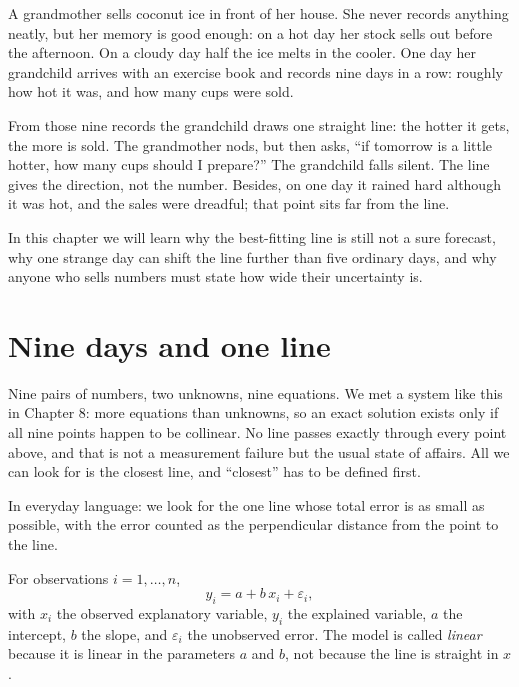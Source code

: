 \begin{untukanak}
A grandmother sells coconut ice in front of her house. She never records anything neatly, but
her memory is good enough: on a hot day her stock sells out before the afternoon. On a cloudy
day half the ice melts in the cooler. One day her grandchild arrives with an exercise book and
records nine days in a row: roughly how hot it was, and how many cups were sold.

From those nine records the grandchild draws one straight line: the hotter it gets, the more is
sold. The grandmother nods, but then asks, ``if tomorrow is a little hotter, how many cups
should I prepare?'' The grandchild falls silent. The line gives the direction, not the number.
Besides, on one day it rained hard although it was hot, and the sales were dreadful; that point
sits far from the line.

In this chapter we will learn why the best-fitting line is still not a sure forecast, why one
strange day can shift the line further than five ordinary days, and why anyone who sells
numbers must state how wide their uncertainty is.
\end{untukanak}

\section{Nine days and one line}

Nine pairs of numbers, two unknowns, nine equations. We met a system like this in Chapter 8:
more equations than unknowns, so an exact solution exists only if all nine points happen to be
collinear. No line passes exactly through every point above, and that is not a measurement
failure but the usual state of affairs. All we can look for is the closest line, and
``closest'' has to be defined first.

In everyday language: we look for the one line whose total error is as small as possible, with
the error counted as the perpendicular distance from the point to the line.


\begin{definisi}
For observations $i=1,\dots,n$,
\[
y_i = a + b\,x_i + \varepsilon_i ,
\]
with $x_i$ the observed explanatory variable, $y_i$ the explained variable, $a$ the intercept,
$b$ the slope, and $\varepsilon_i$ the unobserved error. The model is called \emph{linear}
because it is linear in the parameters $a$ and $b$, not because the line is straight in $x$.
\end{definisi}

